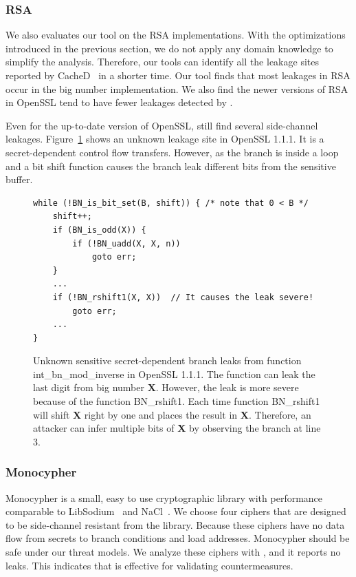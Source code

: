 \subsubsection*{RSA}
We also evaluates our tool on the RSA implementations. With the optimizations
introduced in the previous section, we do not apply any domain knowledge to
simplify the analysis. Therefore, our tools can identify all the leakage sites
reported by CacheD~\cite{203878} in a shorter time. Our tool finds that most
leakages in RSA occur in the big number implementation. We also find the newer
versions of RSA in OpenSSL tend to have fewer leakages detected by \detect{}. 

Even for the up-to-date version of OpenSSL, \detect{} still find several
side-channel leakages. Figure~\ref{chapter3:fig:unknown_leakage} shows an unknown leakage site in OpenSSL 1.1.1. It is a secret-dependent control flow transfers. 
However, as the branch is inside a loop and a bit shift function causes the branch leak different bits from the sensitive buffer.

\begin{figure}[ht]
\centering
\begin{lstlisting}[xleftmargin=.02\textwidth,xrightmargin=.01\textwidth]
while (!BN_is_bit_set(B, shift)) { /* note that 0 < B */
    shift++;
    if (BN_is_odd(X)) {
        if (!BN_uadd(X, X, n))
            goto err;
    }
    ...
    if (!BN_rshift1(X, X))  // It causes the leak severe!
        goto err;
    ...
}
\end{lstlisting}
    \caption{Unknown sensitive secret-dependent branch leaks from function 
             \textsf{int\_bn\_mod\_inverse} in OpenSSL 1.1.1. The function can leak the last digit from big number \textbf{X}. However, the leak is more severe because of the 
             function \textsf{BN\_rshift1}. Each time function \textsf{BN\_rshift1}
             will shift \textbf{X} right by one and places the result in \textbf{X}. Therefore,
             an attacker can infer multiple bits of \textbf{X} by observing the branch at line 3.}
    \label{chapter3:fig:unknown_leakage}
\end{figure}


\subsubsection*{Monocypher}\label{eval:mono}
Monocypher is a small, easy to use cryptographic library with
performance comparable to LibSodium~\cite{libsodium} and NaCl~\cite{bernstein2012security}.
We choose four ciphers that are
designed to be side-channel resistant from the library.
Because these ciphers have no
data flow from secrets to branch conditions and load addresses.
Monocypher should be safe under our threat models.
We analyze these ciphers with \detect{}, and it reports no leaks.
This indicates that \detect{} is effective for validating countermeasures.






